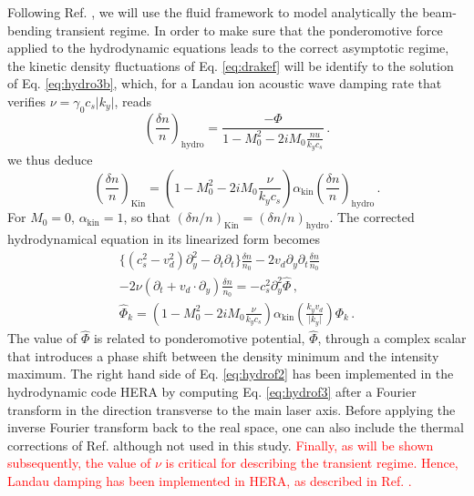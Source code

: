 \documentclass[%
 reprint,
 amsmath,amssymb,
 aps,
]{revtex4-1}
\begin{document}
Following Ref. \cite[]{POP_Debayle_2018}, we will use the fluid framework to model analytically  the beam-bending transient regime. In order to make sure that the ponderomotive force applied to the hydrodynamic equations leads to the correct asymptotic regime, the kinetic density fluctuations of Eq. \eqref{eq:drakef}  will be identify to the solution of Eq. \eqref{eq:hydro3b}, which, for a Landau ion acoustic wave damping rate that verifies $\nu=\gamma_0c_s \vert k_y\vert$, reads 
\begin{equation}
\left(\frac{\delta n}{n}\right)_\mathrm{hydro} =\frac{-\Phi}{1-M_0^2 -2i M_0 \frac{nu}{k_y c_s}} \, .
\end{equation} 
we thus deduce 
\begin{equation}
\left(\frac{\delta n}{n}\right)_\mathrm{Kin} =\left(1-M_0^2 -2iM_0\frac{\nu}{k_y c_s} \right)  \alpha_\mathrm{kin}
\left(\frac{\delta n}{n}\right)_\mathrm{hydro}\, .
\end{equation} 
For $M_0 =0$, $\alpha_\mathrm{kin}=1$, so that $(\delta n/n)_\mathrm{Kin} = (\delta n/n)_\mathrm{hydro}$.
The corrected hydrodynamical equation in its linearized form becomes 
\begin{align}
 \{ (c_s^2-v_d^2)\partial_y^2 -\partial_t \partial_t\}    \frac{  \delta n }{n_0} - 2 v_d \partial_y  \partial_t \frac{  \delta n }{n_0}   \nonumber \\
-2\nu  (\partial_t + v_d  \cdot \partial_y) \frac{  \delta n }{n_0}   = - c_s^2\partial_y^2 \hat{\Phi} \, , \label{eq:hydrof2} \\
 \hat{\Phi}_k  =\left(1-M_0^2 -2iM_0\frac{\nu}{k_y c_s}\right)    \alpha_\mathrm{kin}\left(\frac{k_y v_d}{\vert k_y \vert }\right)\Phi_k  \, .\label{eq:hydrof3} 
\end{align}
The value of $\hat{\Phi}$ is related to ponderomotive potential, $\hat{\Phi}$, through a complex scalar that introduces a phase shift between the density minimum and the intensity maximum. The right hand side of Eq. \eqref{eq:hydrof2} has been implemented in the hydrodynamic  code HERA  by computing Eq. \eqref{eq:hydrof3} after a Fourier transform in the direction transverse to the main laser axis. Before applying the inverse Fourier transform back to the real space, one can also include the thermal corrections of Ref. \cite[]{Bychenkov_2000} although not used in this study.
\textcolor{red}{Finally, as will be shown subsequently, the value of $\nu$  is critical for describing  the transient regime. Hence, Landau damping has been implemented in HERA, as described in Ref. \cite[]{harmony}.}
\end{document}
